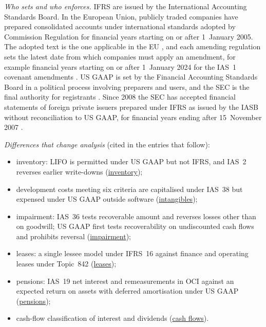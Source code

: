 \begin{qfdefinition}\label{def:ifrs-us-gaap-reporting-systems}
 \emph{Who sets and who enforces.} IFRS are issued by the International Accounting Standards Board. In the European Union, publicly traded companies have prepared consolidated accounts under international standards adopted by Commission Regulation for financial years starting on or after 1~January 2005. The adopted text is the one applicable in the EU \citep[Regulation (EU) 2023/1803, recitals~1--2]{eu-2023-1803-ias1}, and each amending regulation sets the latest date from which companies must apply an amendment, for example financial years starting on or after 1~January 2024 for the IAS~1 covenant amendments \citep[Art.~2]{eu-2023-2822-ias1}. US GAAP is set by the Financial Accounting Standards Board in a political process involving preparers and users, and the SEC is the final authority for registrants \citep[pp.~70--72]{financial-statement-analysis-2009}. Since 2008 the SEC has accepted financial statements of foreign private issuers prepared under IFRS as issued by the IASB without reconciliation to US GAAP, for financial years ending after 15~November 2007 \citep[p.~986]{sec-ifrs-acceptance-2008}.

\emph{Differences that change analysis} (cited in the entries that follow):
\begin{itemize}
\item inventory: LIFO is permitted under US GAAP but not IFRS, and IAS~2 reverses earlier write-downs (\hyperref[meth:inventory-cost-formulas]{inventory});
\item development costs meeting six criteria are capitalised under IAS~38 but expensed under US GAAP outside software (\hyperref[meth:intangible-acquisition-routes]{intangibles});
\item impairment: IAS~36 tests recoverable amount and reverses losses other than on goodwill; US GAAP first tests recoverability on undiscounted cash flows and prohibits reversal (\hyperref[meth:impairment-derecognition]{impairment});
\item leases: a single lessee model under IFRS~16 against finance and operating leases under Topic~842 (\hyperref[meth:lease-reporting]{leases});
\item pensions: IAS~19 net interest and remeasurements in OCI against an expected return on assets with deferred amortisation under US GAAP (\hyperref[meth:post-employment-benefit-reporting]{pensions});
\item cash-flow classification of interest and dividends (\hyperref[meth:statement-linked-cash-flows]{cash flows}).
\end{itemize}


\end{qfdefinition}
